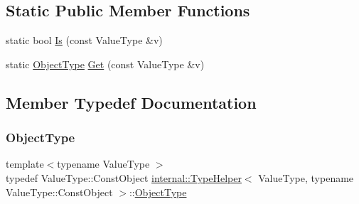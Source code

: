\subsection*{Static Public Member Functions}
\begin{DoxyCompactItemize}
\item 
static bool \hyperlink{structinternal_1_1TypeHelper_3_01ValueType_00_01typename_01ValueType_1_1ConstObject_01_4_a843e707732c55f2178d399a0af13605a}{Is} (const Value\+Type \&v)
\item 
static \hyperlink{structinternal_1_1TypeHelper_3_01ValueType_00_01typename_01ValueType_1_1ConstObject_01_4_a986df6ac09ceb6cc9ba9fd4d73e90495}{Object\+Type} \hyperlink{structinternal_1_1TypeHelper_3_01ValueType_00_01typename_01ValueType_1_1ConstObject_01_4_ae6a797157c9b3d15ca4a32c48ea4bc73}{Get} (const Value\+Type \&v)
\end{DoxyCompactItemize}


\subsection{Member Typedef Documentation}
\mbox{\label{structinternal_1_1TypeHelper_3_01ValueType_00_01typename_01ValueType_1_1ConstObject_01_4_a986df6ac09ceb6cc9ba9fd4d73e90495}} 
\subsubsection{\texorpdfstring{Object\+Type}{ObjectType}}
{\footnotesize\ttfamily template$<$typename Value\+Type $>$ \\
typedef Value\+Type\+::\+Const\+Object \hyperlink{structinternal_1_1TypeHelper}{internal\+::\+Type\+Helper}$<$ Value\+Type, typename Value\+Type\+::\+Const\+Object $>$\+::\hyperlink{structinternal_1_1TypeHelper_3_01ValueType_00_01typename_01ValueType_1_1ConstObject_01_4_a986df6ac09ceb6cc9ba9fd4d73e90495}{Object\+Type}}



